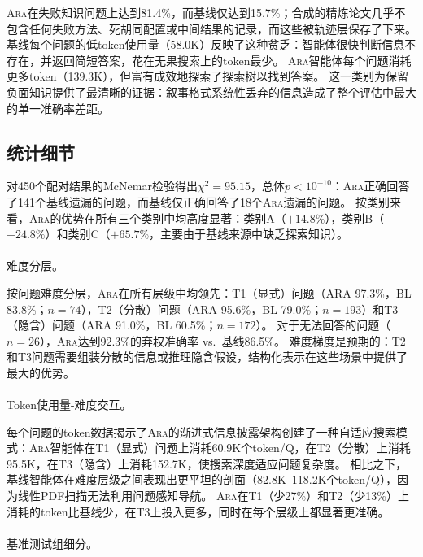 \documentclass[
]{article}
\makeatletter
\let\oldparagraph\paragraph
\renewcommand{\paragraph}{
    \@ifstar
      \xxxParagraphStar
      \xxxParagraphNoStar
  }
\newcommand{\xxxParagraphStar}[1]{\oldparagraph*{#1}\mbox{}}
\newcommand{\xxxParagraphNoStar}[1]{\oldparagraph{#1}\mbox{}}
\theoremstyle{definition}
\newcommand{\ara}{\textsc{Ara}}
\makeatother
\begin{document}
\ara{}在失败知识问题上达到81.4\%，而基线仅达到15.7\%；合成的精炼论文几乎不包含任何失败方法、死胡同配置或中间结果的记录，而这些被轨迹层保存了下来。
基线每个问题的低token使用量（58.0K）反映了这种贫乏：智能体很快判断信息不存在，并返回简短答案，花在无果搜索上的token最少。
\ara{}智能体每个问题消耗更多token（139.3K），但富有成效地探索了探索树以找到答案。
这一类别为保留负面知识提供了最清晰的证据：叙事格式系统性丢弃的信息造成了整个评估中最大的单一准确率差距。

\subsection{统计细节}\label{sec-app-understanding-stats}

对450个配对结果的McNemar检验得出\(\chi^2 = 95.15\)，总体\(p < 10^{-10}\)：\ara{}正确回答了141个基线遗漏的问题，而基线仅正确回答了18个\ara{}遗漏的问题。
按类别来看，\ara{}的优势在所有三个类别中均高度显著：类别A（\(+14.8\%\)），类别B（\(+24.8\%\)）和类别C（\(+65.7\%\)，主要由于基线来源中缺乏探索知识）。

\paragraph{难度分层。}\label{ux96beux5ea6ux5206ux5c42}

按问题难度分层，\ara{}在所有层级中均领先：T1（显式）问题（ARA 97.3\%，BL
83.8\%；\(n = 74\)），T2（分散）问题（ARA 95.6\%，BL
79.0\%；\(n = 193\)）和T3（隐含）问题（ARA 91.0\%，BL
60.5\%；\(n = 172\)）。
对于无法回答的问题（\(n = 26\)），\ara{}达到92.3\%的弃权准确率
vs.~基线86.5\%。
难度梯度是预期的：T2和T3问题需要组装分散的信息或推理隐含假设，结构化表示在这些场景中提供了最大的优势。

\paragraph{Token使用量-难度交互。}\label{tokenux4f7fux7528ux91cf-ux96beux5ea6ux4ea4ux4e92}

每个问题的token数据揭示了\ara{}的渐进式信息披露架构创建了一种自适应搜索模式：\ara{}智能体在T1（显式）问题上消耗60.9K个token/Q，在T2（分散）上消耗95.5K，在T3（隐含）上消耗152.7K，使搜索深度适应问题复杂度。
相比之下，基线智能体在难度层级之间表现出更平坦的剖面（82.8K--118.2K个token/Q），因为线性PDF扫描无法利用问题感知导航。
\ara{}在T1（少27\%）和T2（少13\%）上消耗的token比基线少，在T3上投入更多，同时在每个层级上都显著更准确。

\paragraph{基准测试组细分。}\label{ux57faux51c6ux6d4bux8bd5ux7ec4ux7ec6ux5206}
\end{document}
